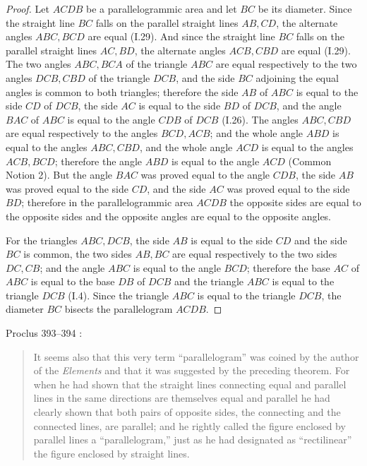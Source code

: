 \documentclass{article}
\begin{document}
\begin{proof}
Let $ACDB$ be a parallelogrammic area and let $BC$ be its diameter.
Since the straight line $BC$ falls on the parallel straight lines $AB,CD$,
the alternate angles $ABC,BCD$ are equal (I.29).
And since the straight line $BC$ falls on the parallel straight lines
$AC,BD$, the alternate angles $ACB,CBD$ are equal (I.29).
The two angles $ABC,BCA$ of the triangle $ABC$ are equal respectively to
the two angles $DCB,CBD$ of the triangle $DCB$, and the side $BC$ adjoining the equal angles
is common to both triangles; therefore
the side $AB$ of $ABC$ is equal to the side $CD$ of $DCB$, the
side $AC$ is equal to the side $BD$ of $DCB$, and the angle
$BAC$ of $ABC$ is equal to the angle $CDB$ of $DCB$ (I.26).
The angles $ABC,CBD$ are equal respectively to the angles
$BCD,ACB$;
and the whole angle $ABD$ is equal to the angles $ABC,CBD$, and the whole
angle $ACD$ is equal to the angles $ACB,BCD$; therefore 
the angle $ABD$ is equal to the angle $ACD$ (Common Notion 2).
But the angle $BAC$ was proved equal to the angle $CDB$,
the side $AB$ was proved equal to the side $CD$, and the side $AC$ was proved equal to the side
$BD$; therefore in the parallelogrammic area $ACDB$ the opposite sides are equal to the opposite sides
and the opposite angles are equal to the opposite angles.

For the triangles $ABC,DCB$, the side $AB$ is equal to the side $CD$ and the side $BC$ is common,
the two sides $AB,BC$ are equal respectively to the two sides $DC,CB$;
and the angle $ABC$ is equal to the angle $BCD$;
therefore the base $AC$ of $ABC$ is equal to the base $DB$ of $DCB$ and the triangle
$ABC$ is equal to the triangle $DCB$ (I.4).
Since the triangle $ABC$ is equal to the triangle $DCB$, the diameter $BC$ bisects the parallelogram
$ACDB$.
\end{proof}

Proclus 393--394 \cite[p.~309]{proclus}:

\begin{quote}
It seems also that this very term ``parallelogram'' was coined by the author of the {\em Elements} and that
it was suggested by the preceding theorem. For when he had
shown that the straight lines connecting equal and parallel
lines in the same directions are themselves equal and parallel
he had clearly shown that both pairs of opposite sides, the
connecting and the connected lines, are parallel; and he
rightly called the figure enclosed by parallel lines a ``parallelogram,''
just as he had designated as ``rectilinear'' the
figure enclosed by straight lines.
\end{quote}
\end{document}
